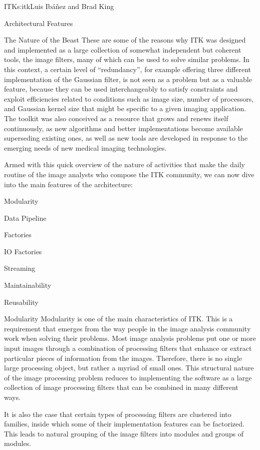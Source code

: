 \begin{aosachapter}{ITK}{s:itk}{Luis Ib\'{a}\~{n}ez and Brad King}
\begin{aosasect1}{Architectural Features}
\begin{aosasect2}{The Nature of the Beast}
These are some of the reasons why ITK was designed and implemented as a large
collection of somewhat independent but coherent tools, the image filters, many
of which can be used to solve similar problems. In this context, a certain
level of ``redundancy'', for example offering three different implementation of
the Gaussian filter, is not seen as a problem but as a valuable feature,
because they can be used interchangeably to satisfy constraints and exploit
efficiencies related to conditions such as image size, number of processors,
and Gaussian kernel size that might be specific to a given imaging application.
The toolkit was also conceived as a resource that  grows and renews itself
continuously, as new algorithms and better implementations become available
superseding existing ones, as well as new tools are developed in response to the
emerging needs of new medical imaging technologies.

Armed with this quick overview of the nature of activities that make the daily
routine of the image analysts who compose the ITK community, we can now dive
into the main features of the architecture:

\begin{aosaitemize}
\item Modularity
\item Data Pipeline
\item Factories
\item IO Factories
\item Streaming
\item Maintainability
\item Reusability
\end{aosaitemize}

\end{aosasect2}

\begin{aosasect2}{Modularity}
Modularity is one of the main characteristics of ITK. This is a requirement
that emerges from the way people in the image analysis community work when
solving their problems. Most image analysis problems put one or more
input images through a combination of processing filters that enhance or
extract particular pieces of information from the images. Therefore,
there is no single large processing object, but rather a myriad of small ones.
This structural nature of the image processing problem reduces to implementing the
software as a large collection of image processing filters that can be combined
in many different ways.

It is also the case that certain types of processing filters are clustered into
families, inside which some of their implementation features can be factorized.
This leads to natural grouping of the image filters into modules and groups of
modules.


\end{aosasect2}
\end{aosasect1}
\end{aosachapter}
